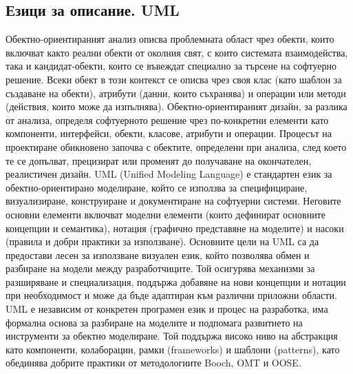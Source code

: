 \documentclass{article}
\renewcommand{\\}{\newline}
\begin{document}
\subsection{Езици за описание. UML}
Обектно-ориентираният анализ описва проблемната област чрез обекти, които включват както реални обекти от околния свят, с които системата взаимодейства, така и кандидат-обекти, които се въвеждат специално за търсене на софтуерно решение. Всеки обект в този контекст се описва чрез своя клас (като шаблон за създаване на обекти), атрибути (данни, които съхранява) и операции или методи (действия, които може да изпълнява). Обектно-ориентираният дизайн, за разлика от анализа, определя софтуерното решение чрез по-конкретни елементи като компоненти, интерфейси, обекти, класове, атрибути и операции. Процесът на проектиране обикновено започва с обектите, определени при анализа, след което те се допълват, прецизират или променят до получаване на окончателен, реалистичен дизайн. UML (Unified Modeling Language) е стандартен език за обектно-ориентирано моделиране, който се използва за специфициране, визуализиране, конструиране и документиране на софтуерни системи. Неговите основни елементи включват моделни елементи (които дефинират основните концепции и семантика), нотация (графично представяне на моделите) и насоки (правила и добри практики за използване). Основните цели на UML са да предостави лесен за използване визуален език, който позволява обмен и разбиране на модели между разработчиците. Той осигурява механизми за разширяване и специализация, поддържа добавяне на нови концепции и нотации при необходимост и може да бъде адаптиран към различни приложни области. UML е независим от конкретен програмен език и процес на разработка, има формална основа за разбиране на моделите и подпомага развитието на инструменти за обектно моделиране. Той поддържа високо ниво на абстракция като компоненти, колаборации, рамки (frameworks) и шаблони (patterns), като обединява добрите практики от методологиите Booch, OMT и OOSE.
\end{document}

